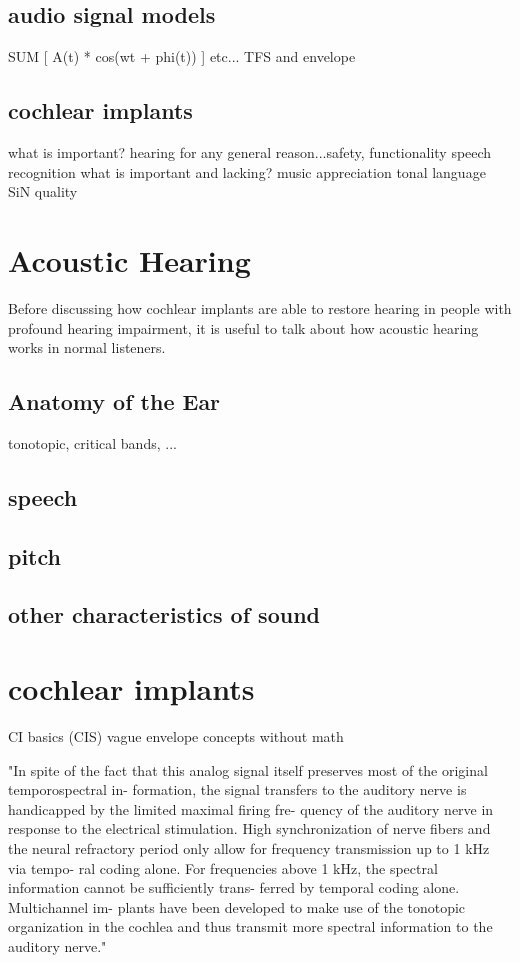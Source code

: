 \documentclass [11pt, proquest] {uwthesis}[2015/03/03]
\begin{document}
	\subsection{audio signal models}
	SUM [ A(t) * cos(wt + phi(t)) ]
	etc...
	TFS and envelope
	
	\subsection{cochlear implants}
	what is important?
		hearing for any general reason...safety, functionality
		speech recognition
	what is important and lacking?
		music appreciation
		tonal language
		SiN
		quality

\fi


\section{Acoustic Hearing}

Before discussing how cochlear implants are able to restore hearing in people with profound hearing impairment, it is useful to talk about how acoustic hearing works in normal listeners.

\subsection{Anatomy of the Ear}

tonotopic, critical bands, ...

\subsection{speech}

\subsection{pitch}

\subsection{other characteristics of sound}

\section{cochlear implants}
CI basics (CIS)
vague envelope concepts without math

"In spite of the fact that this analog signal itself preserves most of the original temporospectral in- formation, the signal transfers to the auditory nerve is handicapped by the limited maximal firing fre- quency of the auditory nerve in response to the electrical stimulation. High synchronization of nerve fibers and the neural refractory period only allow for frequency transmission up to 1 kHz via tempo- ral coding alone. For frequencies above 1 kHz, the spectral information cannot be sufficiently trans- ferred by temporal coding alone. Multichannel im- plants have been developed to make use of the tonotopic organization in the cochlea and thus transmit more spectral information to the auditory nerve." \cite{somek2006coding}
\end{document}
